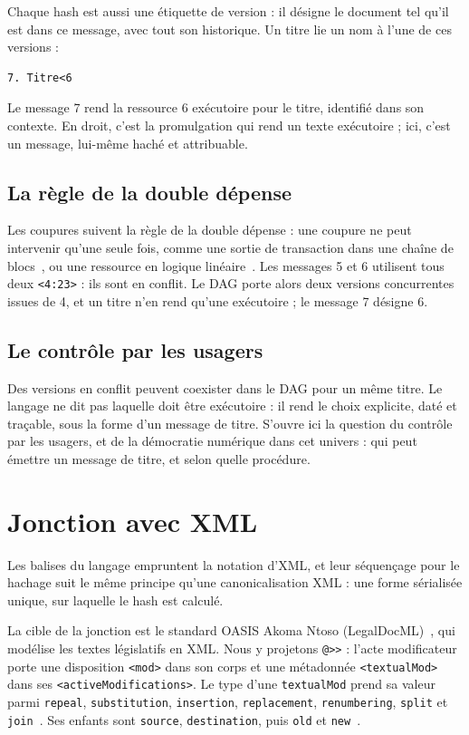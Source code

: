 \documentclass[11pt,a4paper]{article}
\newcommand{\cd}[1]{\texttt{#1}}
\begin{document}
Chaque hash est aussi une étiquette de version : il désigne le document tel qu'il est dans ce message, avec tout son historique. Un titre lie un nom à l'une de ces versions :

\begin{Verbatim}
7. Titre<6
\end{Verbatim}

Le message 7 rend la ressource 6 exécutoire pour le titre, identifié dans son contexte. En droit, c'est la promulgation qui rend un texte exécutoire ; ici, c'est un message, lui-même haché et attribuable.

\subsection{La règle de la double dépense}

Les coupures suivent la règle de la double dépense : une coupure ne peut intervenir qu'une seule fois, comme une sortie de transaction dans une chaîne de blocs~\cite{nakamoto2008}, ou une ressource en logique linéaire~\cite{girard1987}. Les messages 5 et 6 utilisent tous deux \cd{<4:23>} : ils sont en conflit. Le DAG porte alors deux versions concurrentes issues de 4, et un titre n'en rend qu'une exécutoire ; le message 7 désigne 6.

\subsection{Le contrôle par les usagers}

Des versions en conflit peuvent coexister dans le DAG pour un même titre. Le langage ne dit pas laquelle doit être exécutoire : il rend le choix explicite, daté et traçable, sous la forme d'un message de titre. S'ouvre ici la question du contrôle par les usagers, et de la démocratie numérique dans cet univers : qui peut émettre un message de titre, et selon quelle procédure.

\section{Jonction avec XML}

Les balises du langage empruntent la notation d'XML, et leur séquençage pour le hachage suit le même principe qu'une canonicalisation XML : une forme sérialisée unique, sur laquelle le hash est calculé.

La cible de la jonction est le standard OASIS Akoma Ntoso (LegalDocML)~\cite{akn2018}, qui modélise les textes législatifs en XML. Nous y projetons \cd{@>{}>} : l'acte modificateur porte une disposition \cd{<mod>} dans son corps et une métadonnée \cd{<textualMod>} dans ses \cd{<activeModifications>}. Le type d'une \cd{textualMod} prend sa valeur parmi \cd{repeal}, \cd{substitution}, \cd{insertion}, \cd{replacement}, \cd{renumbering}, \cd{split} et \cd{join}~\cite{akntextualmods}. Ses enfants sont \cd{source}, \cd{destination}, puis \cd{old} et \cd{new}~\cite{akntextualmod}.
\end{document}
